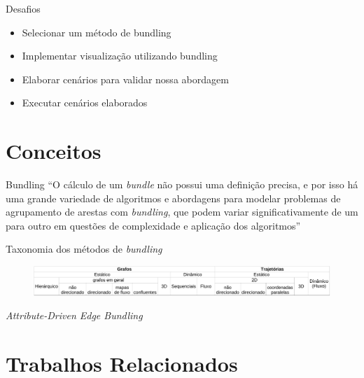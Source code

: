 \begin{frame}{Desafios}
    \begin{itemize}
      \item Selecionar um método de bundling

      \item Implementar visualização utilizando bundling

      \item Elaborar cenários para validar nossa abordagem

      \item Executar cenários elaborados
    \end{itemize}
\end{frame}

\section{Conceitos}

\begin{frame}{Bundling}
 ``O cálculo de um \emph{bundle} não possui uma definição precisa, e por isso há
uma grande variedade de algoritmos e abordagens para modelar problemas de
agrupamento de arestas com \emph{bundling}, que podem variar significativamente
de um para outro em questões de complexidade e aplicação dos algoritmos''

\hfill \citep{Zhou2013}
\end{frame}

\begin{frame}{Taxonomia dos métodos de \emph{bundling}}
  \begin{figure}[!htb]
    \centering
    \includegraphics[width=\textwidth]{../figuras/estado-da-arte.pdf}
  \end{figure}
\end{frame}

\begin{frame}{\emph{Attribute-Driven Edge Bundling}}
    
  
\end{frame}

\section{Trabalhos Relacionados}

